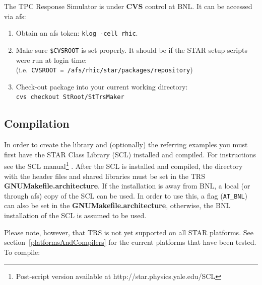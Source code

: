 \documentclass[twoside]{article}
\newcommand{\name}[1]{\textsf{#1}}%
\newcommand{\comp}[1]{\texttt{#1}}%
\begin{document}
The \name{TPC Response Simulator} is under {\bf CVS} control at BNL.  It can
be accessed via \name{afs}:   
\begin{enumerate}
  \item Obtain an \name{afs} token: \comp{klog -cell rhic}.
  \item Make sure \comp{\$CVSROOT} is set properly.  It should be
    if the STAR setup scripts were run at login time:\\
    (i.e.~\comp{CVSROOT = /afs/rhic/star/packages/repository})
  \item Check-out package into your current working directory:\\
    \comp{cvs checkout StRoot/StTrsMaker}
\end{enumerate}

\subsection{Compilation}   \label{compile}

In order to create the library and (optionally) the referring examples
you must first have the STAR Class Library (\name{SCL})  installed
and compiled.  For instructions see the \name{SCL} manual\footnote{Post-script
  version available at http://star.physics.yale.edu/SCL}
.  After the \name{SCL} is installed and compiled,
the directory with the  header files and shared libraries must
be set in the \name{TRS} {\bf GNUMakefile.architecture}.  If the
installation is away from BNL, a local (or through \name{afs})
copy of the \name{SCL} can be used.  In order to use this, a flag
(\texttt{AT\_BNL}) can also be set in the {\bf GNUMakefile.architecture},
otherwise, the BNL installation of the \name{SCL} is assumed to be used.

Please note, however, that \name{TRS} is not yet supported
on all STAR platforms.
See section~\ref{platformsAndCompilers} for the current platforms that have
been tested.  To compile:
\end{document}

